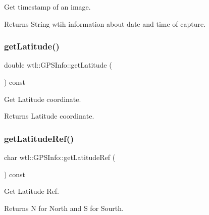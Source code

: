 Get timestamp of an image. 

\begin{DoxyReturn}{Returns}
String wtih information about date and time of capture. 
\end{DoxyReturn}
\mbox{\label{classwtl_1_1_g_p_s_info_a49ee0291a45c95c3f06f6841e9862ec6}} 
\subsubsection{\texorpdfstring{get\+Latitude()}{getLatitude()}}
{\footnotesize\ttfamily double wtl\+::\+G\+P\+S\+Info\+::get\+Latitude (\begin{DoxyParamCaption}{ }\end{DoxyParamCaption}) const}



Get Latitude coordinate. 

\begin{DoxyReturn}{Returns}
Latitude coordinate. 
\end{DoxyReturn}
\mbox{\label{classwtl_1_1_g_p_s_info_a661af4256c1e095928ee0ad5181375de}} 
\subsubsection{\texorpdfstring{get\+Latitude\+Ref()}{getLatitudeRef()}}
{\footnotesize\ttfamily char wtl\+::\+G\+P\+S\+Info\+::get\+Latitude\+Ref (\begin{DoxyParamCaption}{ }\end{DoxyParamCaption}) const}



Get Latitude Ref. 

\begin{DoxyReturn}{Returns}
N for North and S for Sourth. 
\end{DoxyReturn}
\mbox{\label{classwtl_1_1_g_p_s_info_a377631688df7ecb4d6d35a40eb657a6f}} 
